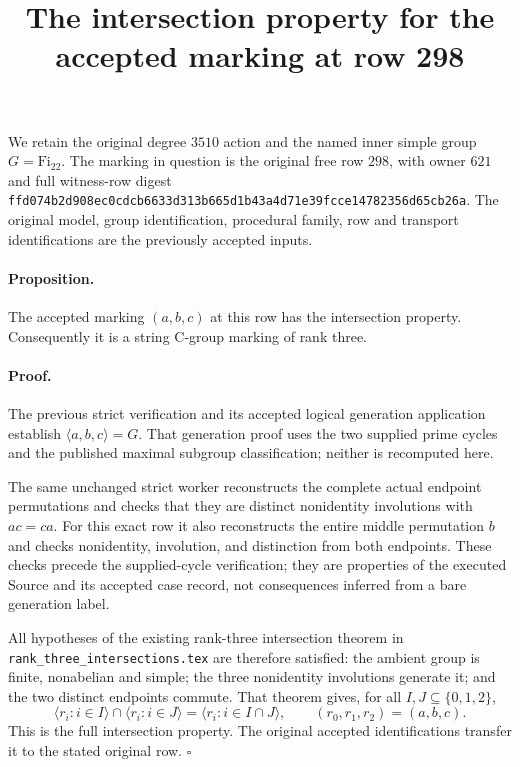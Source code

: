 \documentclass[11pt]{article}
\title{The intersection property for the accepted marking at row 298}
\author{}
\date{}
\newcommand{\Gen}[1]{\langle #1\rangle}
\begin{document}
\maketitle

We retain the original degree $3510$ action and the named inner simple
group $G=\mathrm{Fi}_{22}$. The marking in question is the original free
row $298$, with owner $621$ and full witness-row digest
\texttt{ffd074b2d908ec0cdcb6633d313b665d1b43a4d71e39fcce14782356d65cb26a}.
The original model, group identification, procedural family, row and
transport identifications are the previously accepted inputs.

\paragraph{Proposition.}
The accepted marking $(a,b,c)$ at this row has the intersection property.
Consequently it is a string C-group marking of rank three.

\paragraph{Proof.}
The previous strict verification and its accepted logical generation
application establish $\Gen{a,b,c}=G$. That generation proof uses the
two supplied prime cycles and the published maximal subgroup
classification; neither is recomputed here.

The same unchanged strict worker reconstructs the complete actual endpoint
permutations and checks that they are distinct nonidentity involutions
with $ac=ca$. For this exact row it also reconstructs the entire middle
permutation $b$ and checks nonidentity, involution, and distinction from
both endpoints. These checks precede the supplied-cycle verification;
they are properties of the executed Source and its accepted case record,
not consequences inferred from a bare generation label.

All hypotheses of the existing rank-three intersection theorem in
\texttt{rank\_three\_intersections.tex} are therefore satisfied: the
ambient group is finite, nonabelian and simple; the three nonidentity
involutions generate it; and the two distinct endpoints commute.
That theorem gives, for all $I,J\subseteq\{0,1,2\}$,
\[
 \Gen{r_i:i\in I}\cap\Gen{r_i:i\in J}
   =\Gen{r_i:i\in I\cap J},
 \qquad (r_0,r_1,r_2)=(a,b,c).
\]
This is the full intersection property. The original accepted
identifications transfer it to the stated original row.
\hfill$\square$
\end{document}
